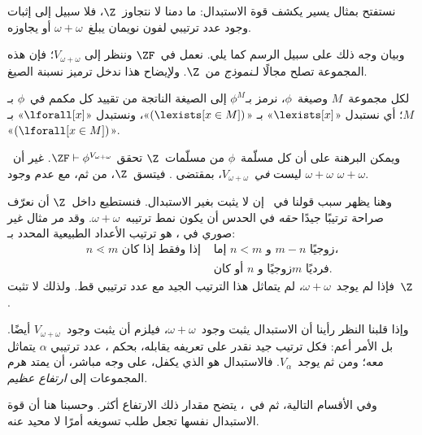 \documentclass[../../../include/open-logic-section]{subfiles}
\begin{document}

نستفتح بمثال يسير يكشف قوة الاستبدال: ما دمنا لا نتجاوز~$\Z$، فلا
سبيل إلى إثبات وجود عدد ترتيبي لفون نويمان يبلغ~$\omega + \omega$
أو يجاوزه.

وبيان وجه ذلك على سبيل الرسم كما يلي. نعمل في~$\ZF$ وننظر إلى
$V_{\omega+\omega}$؛ فإن هذه المجموعة تصلح مجالًا لـ\emph{نموذج}
من~$\Z$. ولإيضاح هذا ندخل ترميز نسبنة الصيغ.
\begin{defn}
	لكل مجموعة~$M$ وصيغة~$\phi$، نرمز بـ$\phi^M$ إلى الصيغة الناتجة
	من تقييد كل مكمم في~$\phi$ بـ$M$؛ أي نستبدل «$\lexists[x]$» بـ
	«$(\lexists[x \in M])$»، ونستبدل «$\lforall[x]$» بـ
	«$(\lforall[x \in M])$».
\end{defn}\noindent
ويمكن البرهنة على أن كل مسلّمة~$\phi$ من مسلّمات~$\Z$ تحقق
$\ZF \vdash \phi^{V_{\omega+\omega}}$. غير أن~$\omega+\omega$ ليست
\emph{في}~$V_{\omega+\omega}$، بمقتضى
. فيتسق~$\Z$، من ثم، مع عدم وجود
$\omega+\omega$.

وهنا يظهر سبب قولنا في~ إن
 لا يثبت بغير
الاستبدال. فنستطيع داخل~$\Z$ أن نعرّف صراحة ترتيبًا جيدًا \emph{حقه}
في الحدس أن يكون نمط ترتيبه~$\omega+\omega$. وقد مر مثال غير صوري في
، هو ترتيب الأعداد الطبيعية المحدد بـ:
\begin{align*}
	n \lessdot m \text{ إذا وفقط إذا كان }&
	\text{إما }n < m\text{ و }m-n\text{ زوجيًا،}\\
	& \text{أو كان $n$ زوجيًا و$m$ فرديًا.}
\end{align*}
فإذا لم يوجد~$\omega+\omega$، لم يتماثل هذا الترتيب الجيد مع عدد
ترتيبي قط. ولذلك لا تثبت~$\Z$
.

وإذا قلبنا النظر رأينا أن الاستبدال يثبت وجود~$\omega+\omega$، فيلزم
أن يثبت وجود~$V_{\omega+\omega}$ أيضًا. بل الأمر أعم: فكل ترتيب جيد
نقدر على تعريفه يقابله، بحكم
، عدد ترتيبي
$\alpha$ يتماثل معه؛ ومن ثم يوجد~$V_\alpha$. فالاستبدال هو الذي يكفل،
على وجه مباشر، أن يمتد هرم المجموعات إلى \emph{ارتفاع عظيم}.

وفي الأقسام التالية، ثم في~، يتضح
مقدار ذلك الارتفاع أكثر. وحسبنا هنا أن قوة الاستبدال نفسها تجعل طلب
تسويغه أمرًا لا محيد عنه.
\end{document}
